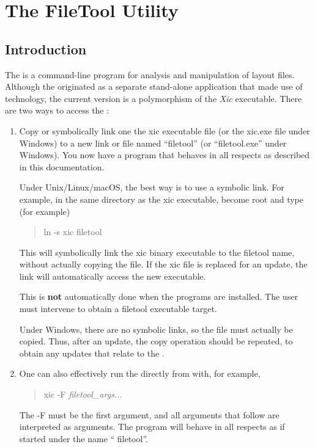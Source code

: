 
\chapter{The FileTool Utility}
\label{filetool}
\section{Introduction}

The {\FileTool} is a command-line program for analysis and
manipulation of layout files.  Although the {\FileTool} originated as
a separate stand-alone application that made use of {\Xic} technology,
the current version is a polymorphism of the {\it Xic} executable. 
There are two ways to access the {\FileTool}:

\begin{enumerate}
\item{Copy or symbolically link one the {\vt xic} executable file (or
the {\vt xic.exe} file under Windows) to a new link or file named
``{\vt filetool}'' (or ``{\vt filetool.exe}'' under Windows).  You now
have a {\FileTool} program that behaves in all respects as described
in this documentation.

Under Unix/Linux/macOS, the best way is to use a symbolic link.  For
example, in the same directory as the {\vt xic} executable, become
root and type (for example)
\begin{quote}
\vt ln -s xic filetool
\end{quote}
This will symbolically link the {\vt xic} binary executable to the
{\vt filetool} name, without actually copying the file.  If the {\vt
xic} file is replaced for an update, the link will automatically
access the new executable.

This is {\bf not} automatically done when the programs are installed. 
The user must intervene to obtain a {\vt filetool} executable target.

Under Windows, there are no symbolic links, so the file must actually
be copied.  Thus, after an update, the copy operation should be
repeated, to obtain any updates that relate to the {\FileTool}.}

\item{One can also effectively run the {\FileTool} directly from
{\Xic} with, for example,
\begin{quote}
{\vt xic -F} {\it filetool\_args...}
\end{quote}
The {\vt -F} must be the first argument, and all arguments that
follow are interpreted as {\FileTool} arguments.  The program will
behave in all respects as if started under the name ``{\vt
filetool}''.}
\end{enumerate}

